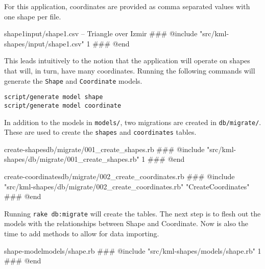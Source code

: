 \documentclass[12pt]{article}
\begin{document}
For this application, coordinates are provided as comma separated values with one shape per file. 

\begin{code}{shape1}{input/shape1.csv -- Triangle over Izmir}
### @include "src/kml-shapes/input/shape1.csv" 1
### @end
\end{code}

This leads intuitively to the notion that the application will operate on shapes that will, in turn, have many coordinates. Running the following commands will generate the \texttt{Shape} and \texttt{Coordinate} models.  

\begin{Verbatim}
script/generate model shape
script/generate model coordinate
\end{Verbatim}

In addition to the models in \texttt{models/}, two migrations are created in \texttt{db/migrate/}. These are used to create the \texttt{shapes} and \texttt{coordinates} tables.

\begin{code}{create-shapes}{db/migrate/001\_create\_shapes.rb}
### @include "src/kml-shapes/db/migrate/001_create_shapes.rb" 1
### @end
\end{code}

\begin{code}{create-coordinates}{db/migrate/002\_create\_coordinates.rb}
### @include "src/kml-shapes/db/migrate/002_create_coordinates.rb" "CreateCoordinates"
### @end
\end{code}

Running \texttt{rake db:migrate} will create the tables.  The next step is to flesh out the models with the relationships between Shape and Coordinate.  Now is also the time to add methods to allow for data importing.

\begin{code}{shape-model}{models/shape.rb}
### @include "src/kml-shapes/models/shape.rb" 1
### @end
\end{code}

\end{document}
